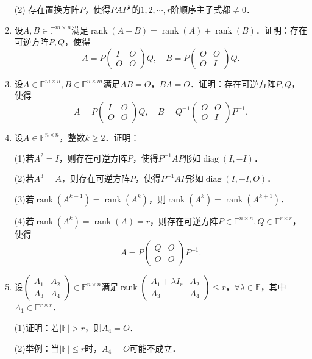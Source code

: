 \documentclass[a4paper,fontset=windows]{ctexbook}
\theoremstyle{definition}
\DeclareMathOperator{\diag}{diag}
\DeclareMathOperator{\rank}{rank}
\renewcommand{\le}{\leqslant}
\renewcommand{\ge}{\geqslant}
\begin{document}
\begin{enumerate}
(2) 存在置换方阵$P$，使得$PAP^T$的$1,2,\cdots,r$阶顺序主子式都$\ne 0$．

\item 设$A,B\in\mathbb{F}^{m\times n}$满足$\rank(A+B)=\rank(A)+\rank(B)$．证明：存在可逆方阵$P,Q$，使得
$$A=P\begin{pmatrix}I&O \\ O&O\end{pmatrix}Q,\quad B=P\begin{pmatrix}O&O \\ O&I\end{pmatrix}Q.$$

\item 设$A\in\mathbb{F}^{m\times n},B\in\mathbb{F}^{n\times m}$满足$AB=O$，$BA=O$．证明：存在可逆方阵$P,Q$，使得
$$A=P\begin{pmatrix}I&O \\ O&O\end{pmatrix}Q,\quad B=Q^{-1}\begin{pmatrix}O&O \\ O&I\end{pmatrix}P^{-1}.$$

\item 设$A\in\mathbb{F}^{n\times n}$，整数$k\ge 2$．证明：

(1)若$A^2=I$，则存在可逆方阵$P$，使得$P^{-1}AP$形如$\diag(I,-I)$．

(2)若$A^3=A$，则存在可逆方阵$P$，使得$P^{-1}AP$形如$\diag(I,-I,O)$．

(3)若$\rank(A^{k-1})=\rank(A^k)$，则$\rank(A^k)=\rank(A^{k+1})$．

(4)若$\rank(A^k)=\rank(A)=r$，则存在可逆方阵$P\in\mathbb{F}^{n\times n},Q\in\mathbb{F}^{r\times r}$，使得
$$A=P\begin{pmatrix}Q&O \\ O&O\end{pmatrix}P^{-1}.$$

\item 设$\begin{pmatrix}A_1&A_2 \\ A_3&A_4\end{pmatrix}\in\mathbb{F}^{n\times n}$满足$\rank\begin{pmatrix}A_1+\lambda I_r&A_2 \\ A_3&A_4\end{pmatrix}\le r$，$\forall\lambda\in\mathbb{F}$，其中$A_1\in\mathbb{F}^{r\times r}$．

(1)证明：若$|\mathbb{F}|>r$，则$A_4=O$．

(2)举例：当$|\mathbb{F}|\le r$时，$A_4=O$可能不成立．


\end{enumerate}
\end{document}
